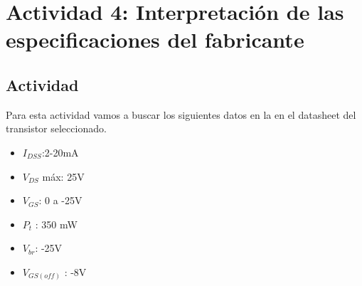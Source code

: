 
\newpage
\section{Actividad 4: Interpretación de las especificaciones del fabricante}

\subsection{Actividad}

Para esta actividad vamos a buscar los siguientes datos en la en el datasheet del transistor seleccionado.

\begin{itemize}
    \item $I_{DSS}$:2-20mA
    \item $V_{DS}$ máx: 25V
    \item $V_{GS}$: 0 a -25V
    \item $P_{t}$ : 350 mW
    \item $V_{br}$: -25V
    \item $V_{GS(off)}$ : -8V
\end{itemize}

